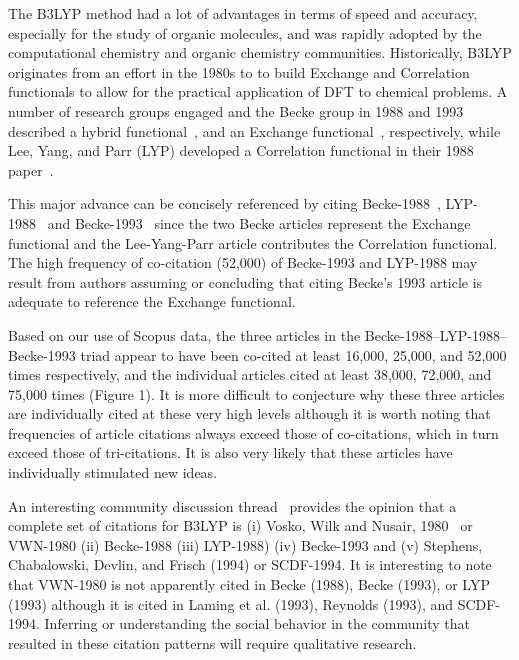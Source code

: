 \documentclass[journal=jcdis8,manuscript=article]{achemso}
\begin{document}
The B3LYP method had a lot of advantages in terms of speed and accuracy, especially for the study of organic molecules, and was rapidly adopted by the computational chemistry and organic chemistry communities. Historically, B3LYP originates from an effort in the 1980s to to build Exchange and Correlation functionals to allow for the practical application of DFT to chemical problems. A number of research groups engaged and the Becke group in 1988 and 1993 described a hybrid functional~\citep{becke1988density}, and an Exchange functional~\citep{becke1993dft}, respectively, while Lee, Yang, and Parr (LYP) developed a Correlation functional in their 1988 paper~\citep{lyp1988}.  

This major advance can be concisely referenced by citing Becke-1988~\citep{becke1988density}, LYP-1988~\citep{lyp1988} and Becke-1993~\citep{becke1993dft} since the two Becke articles represent the Exchange functional and the Lee-Yang-Parr article contributes the Correlation functional. The high frequency of co-citation (52,000) of Becke-1993 and LYP-1988 may result from authors assuming or concluding that citing Becke's 1993 article is adequate to reference the Exchange functional. 

Based on our use of Scopus data, the three articles in the Becke-1988--LYP-1988--Becke-1993 triad appear to have been co-cited at least 16,000, 25,000, and 52,000 times respectively, and the individual articles cited at least 38,000, 72,000, and 75,000 times (Figure 1). It is more difficult to conjecture why these three articles are individually cited at these very high levels although it is worth noting that  frequencies of article citations always exceed those of co-citations, which in turn exceed those of tri-citations. It is also very likely that these articles have individually stimulated new ideas.

An interesting community discussion thread~\citep{johansson2002} provides the opinion that a complete set of citations for B3LYP is (i) Vosko, Wilk and Nusair, 1980~\citep{vosko1980accurate} or VWN-1980 (ii) Becke-1988 (iii) LYP-1988) (iv) Becke-1993 and (v) Stephens, Chabalowski, Devlin, and Frisch (1994) or SCDF-1994. It is interesting to note that VWN-1980  is not apparently cited in Becke (1988), Becke (1993), or LYP (1993) although it is cited in Laming et al. (1993), Reynolds (1993), and SCDF-1994. Inferring or understanding the social behavior in the community that resulted in these citation patterns will require qualitative research.
\end{document}
